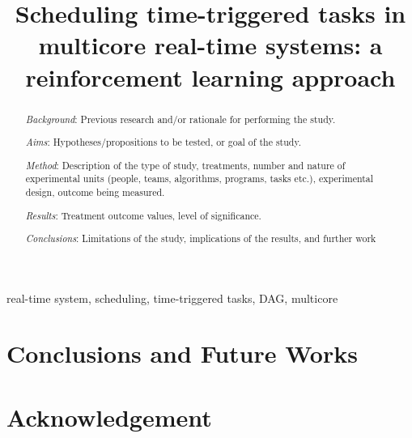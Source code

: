 \documentclass[conference]{IEEEtran}
\begin{document}
\title{Scheduling time-triggered tasks in multicore real-time systems: a reinforcement learning approach\\
}

\author{
}

\maketitle

\begin{abstract}
\textit{Background}: Previous research and/or rationale for performing the study.

\textit{Aims}: Hypotheses/propositions to be tested, or goal of the study.

\textit{Method}: Description of the type of study, treatments, number and nature of
experimental units (people, teams, algorithms, programs, tasks etc.), experimental
design, outcome being measured.



\textit{Results}: Treatment outcome values, level of significance.


\textit{Conclusions}: Limitations of the study, implications of the results, and further work
\end{abstract}

\begin{IEEEkeywords}
real-time system, scheduling, time-triggered tasks, DAG, multicore
\end{IEEEkeywords}












\section{Conclusions and Future Works}









\section*{Acknowledgement}





\end{document}
